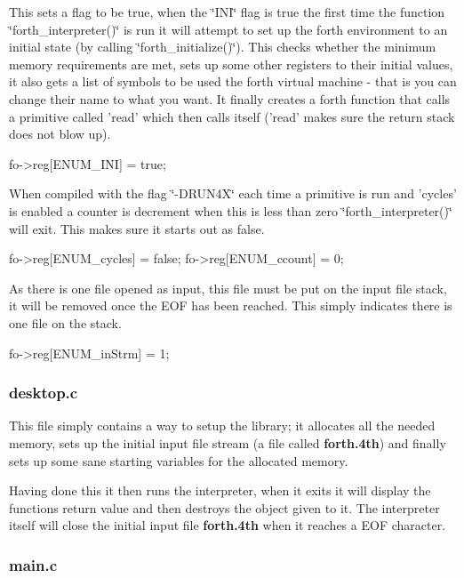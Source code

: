This sets a flag to be true, when the \char`\"{}\-I\-N\-I\char`\"{} flag is true the first time the function \char`\"{}forth\-\_\-interpreter()\char`\"{} is run it will attempt to set up the forth environment to an initial state (by calling \char`\"{}forth\-\_\-initialize()\char`\"{}). This checks whether the minimum memory requirements are met, sets up some other registers to their initial values, it also gets a list of symbols to be used the forth virtual machine -\/ that is you can change their name to what you want. It finally creates a forth function that calls a primitive called 'read' which then calls itself ('read' makes sure the return stack does not blow up). \begin{DoxyVerb}fo->reg[ENUM_INI] = true;
\end{DoxyVerb}


When compiled with the flag \char`\"{}-\/\-D\-R\-U\-N4\-X\char`\"{} each time a primitive is run and 'cycles' is enabled a counter is decrement when this is less than zero \char`\"{}forth\-\_\-interpreter()\char`\"{} will exit. This makes sure it starts out as false. \begin{DoxyVerb}fo->reg[ENUM_cycles] = false; 
fo->reg[ENUM_ccount] = 0; 
\end{DoxyVerb}


As there is one file opened as input, this file must be put on the input file stack, it will be removed once the E\-O\-F has been reached. This simply indicates there is one file on the stack. \begin{DoxyVerb}fo->reg[ENUM_inStrm] = 1;
\end{DoxyVerb}


\subsubsection*{desktop.\-c}

This file simply contains a way to setup the library; it allocates all the needed memory, sets up the initial input file stream (a file called {\bfseries forth.\-4th}) and finally sets up some sane starting variables for the allocated memory.

Having done this it then runs the interpreter, when it exits it will display the functions return value and then destroys the object given to it. The interpreter itself will close the initial input file {\bfseries forth.\-4th} when it reaches a E\-O\-F character.

\subsubsection*{main.\-c}

